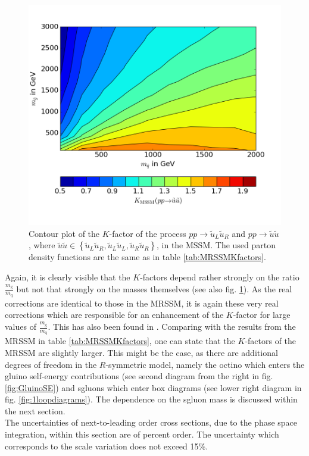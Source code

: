 \begin{figure}[H]
\begin{center}
\includegraphics[scale=.6]{figures/Kfactor_MSSM.png}
\caption{Contour plot of the $K$-factor of the process  $pp \to \tilde{u}_L\tilde{u}_R$ and $pp \to \tilde{u}\tilde{u}$, where \mbox{$\tilde{u}\tilde{u} \in \left\{ \tilde{u}_L\tilde{u}_R, \tilde{u}_L\tilde{u}_L, \tilde{u}_R\tilde{u}_R \right\}$,} in the MSSM. The used parton density functions are the same as in table \ref{tab:MRSSMKfactors}.}\label{fig:Kfactor_MSSM}
\end{center}
\end{figure}
Again, it is clearly visible that the $K$-factors depend rather strongly on the ratio $\frac{m_{\mathrm{g}}}{m_{\mathrm{q}}}$ but not that strongly on the masses themselves (see also fig. \ref{fig:Kfactor_MSSM}). As the real corrections are identical to those in the MRSSM, it is again these very real corrections which are responsible for an enhancement of the $K$-factor for large values of  $\frac{m_{\mathrm{g}}}{m_{\mathrm{q}}}$. This has also been found in \cite{Beenakker:1996ch}.
Comparing with the results from the MRSSM in table \ref{tab:MRSSMKfactors}, one can state that the $K$-factors of the MRSSM are slightly larger. This might be the case, as there are additional degrees of freedom in the $R$-symmetric model, namely the octino which enters the gluino self-energy contributions (see second diagram from the right in fig. \ref{fig:GluinoSE}) and sgluons which enter box diagrams (see lower right diagram in fig. \ref{fig:1loopdiagrams}). The dependence on the sgluon mass is discussed within the next section.\\
The uncertainties of next-to-leading order cross sections, due to the phase space integration, within this section are of percent order. The uncertainty which corresponds to the scale variation does not exceed 15\%.



